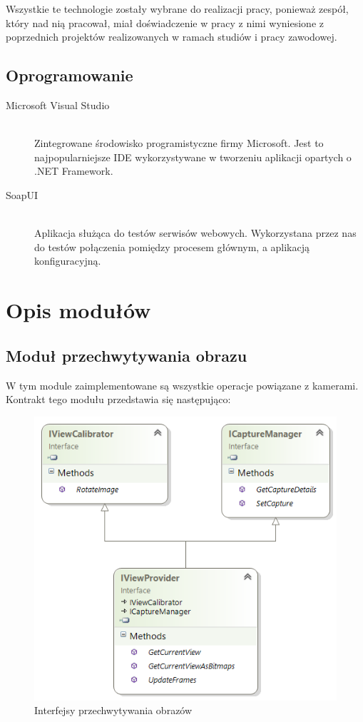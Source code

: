 \documentclass[a4paper,11pt,twoside]{report}
\theoremstyle{definition}
\begin{document}
Wszystkie te technologie zostały wybrane do realizacji pracy, ponieważ zespół, który nad nią pracował, miał doświadczenie w pracy z nimi wyniesione z poprzednich projektów realizowanych w ramach studiów i pracy zawodowej.

\subsection{Oprogramowanie}
\begin{description}
\item [Microsoft Visual Studio] \hfill \\
Zintegrowane środowisko programistyczne firmy Microsoft. Jest to najpopularniejsze IDE wykorzystywane w tworzeniu aplikacji opartych o .NET Framework.
\item [SoapUI] \hfill \\
Aplikacja służąca do testów serwisów webowych. Wykorzystana przez nas do testów połączenia pomiędzy procesem głównym, a aplikacją konfiguracyjną.
\end{description}

\section{Opis modułów}

\subsection{Moduł przechwytywania obrazu}

W tym module zaimplementowane są wszystkie operacje powiązane z kamerami. Kontrakt tego modułu przedstawia się następująco:

\begin{figure}[h]
\centering
\includegraphics[scale=0.9]{images/IViewProvider}
\caption[Przechwytywanie diagram]{Interfejsy przechwytywania obrazów}
\end{figure}
\end{document}
